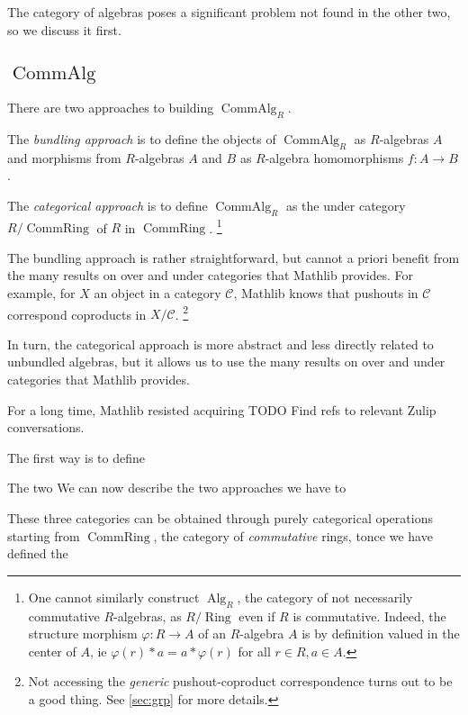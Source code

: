 \documentclass{article}
\newcommand{\mcC}{\mathcal C}
\DeclareMathOperator{\Ring}{Ring}
\DeclareMathOperator{\Alg}{Alg}
\DeclareMathOperator{\CommRing}{CommRing}
\DeclareMathOperator{\CommAlg}{CommAlg}
\begin{document}
The category of algebras poses a significant problem not found in the other two, so we discuss it first.


\subsection{\texorpdfstring{$\CommAlg$}{CommAlg}}\label{sec:comm-alg}


There are two approaches to building $\CommAlg_R$.

The \emph{bundling approach} is to define the objects of $\CommAlg_R$ as $R$-algebras $A$ and morphisms from $R$-algebras $A$ and $B$ as $R$-algebra homomorphisms $f : A \to B$.

\begin{leancode}

\end{leancode}

The \emph{categorical approach} is to define $\CommAlg_R$ as the under category $R / \CommRing$ of $R$ in $\CommRing$.
\footnote{One cannot similarly construct $\Alg_R$, the category of not necessarily commutative $R$-algebras, as $R / \Ring$ even if $R$ is commutative.
Indeed, the structure morphism $\varphi : R \to A$ of an $R$-algebra $A$ is by definition valued in the center of $A$, ie $\varphi(r) * a = a * \varphi(r)$ for all $r \in R, a \in A$.}

The bundling approach is rather straightforward, but cannot a priori benefit from the many results on over and under categories that Mathlib provides.
For example, for $X$ an object in a category $\mcC$, Mathlib knows that pushouts in $\mcC$ correspond coproducts in $X/𝒞$.
\footnote{Not accessing the \emph{generic} pushout-coproduct correspondence turns out to be a good thing.
See \cref{sec:grp} for more details.}

In turn, the categorical approach is more abstract and less directly related to unbundled algebras, but it allows us to use the many results on over and under categories that Mathlib provides.

For a long time, Mathlib resisted acquiring TODO Find refs to relevant Zulip conversations.

The first way is to define



The two  We can now describe the two approaches we have to



These three categories can be obtained through purely categorical operations starting from $\CommRing$, the category of \emph{commutative} rings, tonce we have defined the
\end{document}
